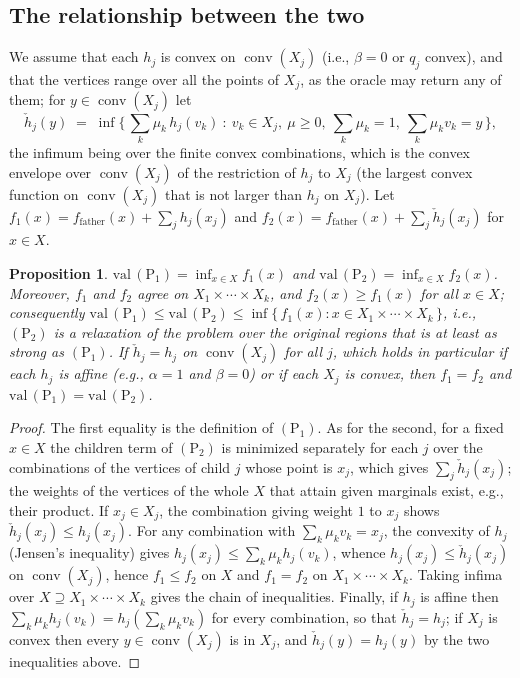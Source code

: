 \documentclass[11pt,a4paper]{article}
\newcommand{\conv}{\operatorname{conv}}
\newcommand{\ffat}{f_{\mathrm{father}}}
\newcommand{\Pone}{(\mathrm{P}_1)}
\newcommand{\Ptwo}{(\mathrm{P}_2)}
\theoremstyle{plain}
\newtheorem{proposition}{Proposition}
\theoremstyle{remark}
\begin{document}
\subsection{The relationship between the two}

We assume that each $h_j$ is convex on $\conv(X_j)$ (i.e., $\beta=0$ or $q_j$
convex), and that the vertices range over all the points of $X_j$, as the oracle
may return any of them; for $y\in\conv(X_j)$ let
\[
  \check h_j(y) \;=\; \inf\Big\{\, \textstyle\sum_k \mu_k\, h_j(v_k)\ :\
    v_k\in X_j,\ \mu\geq 0,\ \sum_k\mu_k=1,\ \sum_k\mu_k v_k=y \,\Big\},
\]
the infimum being over the finite convex combinations, which is the convex
envelope over $\conv(X_j)$ of the restriction of $h_j$ to $X_j$ (the largest
convex function on $\conv(X_j)$ that is not larger than $h_j$ on $X_j$). Let
$f_1(x)=\ffat(x)+\sum_j h_j(x_j)$ and $f_2(x)=\ffat(x)+\sum_j\check h_j(x_j)$ for
$x\in X$.

\begin{proposition}\label{prop:jensen}
$\mathrm{val}\,\Pone=\inf_{x\in X}f_1(x)$ and $\mathrm{val}\,\Ptwo=\inf_{x\in X}
f_2(x)$. Moreover, $f_1$ and $f_2$ agree on $X_1\times\cdots\times X_k$, and
$f_2(x)\geq f_1(x)$ for all $x\in X$; consequently $\mathrm{val}\,\Pone\leq
\mathrm{val}\,\Ptwo\leq\inf\{\, f_1(x) : x\in X_1\times\cdots\times X_k \,\}$,
i.e., $\Ptwo$ is a relaxation of the problem over the original regions that is
at least as strong as $\Pone$. If $\check h_j=h_j$ on $\conv(X_j)$ for all $j$,
which holds in particular if each $h_j$ is affine (e.g., $\alpha=1$ and $\beta=0$)
or if each $X_j$ is convex, then $f_1=f_2$ and $\mathrm{val}\,\Pone=\mathrm{val}\,
\Ptwo$.
\end{proposition}

\begin{proof}
The first equality is the definition of $\Pone$. As for the second, for a fixed
$x\in X$ the children term of $\Ptwo$ is minimized separately for each $j$ over
the combinations of the vertices of child $j$ whose point is $x_j$, which gives
$\sum_j\check h_j(x_j)$; the weights of the vertices of the whole $X$ that
attain given marginals exist, e.g., their product. If $x_j\in X_j$, the
combination giving weight $1$ to $x_j$ shows $\check h_j(x_j)\leq h_j(x_j)$. For
any combination with $\sum_k\mu_k v_k=x_j$, the convexity of $h_j$ (Jensen's
inequality) gives $h_j(x_j)\leq\sum_k\mu_k h_j(v_k)$, whence $h_j(x_j)\leq\check
h_j(x_j)$ on $\conv(X_j)$, hence $f_1\leq f_2$ on $X$ and $f_1=f_2$ on
$X_1\times\cdots\times X_k$. Taking infima over $X\supseteq X_1\times\cdots\times
X_k$ gives the chain of inequalities. Finally, if $h_j$ is affine then
$\sum_k\mu_k h_j(v_k)=h_j(\sum_k\mu_k v_k)$ for every combination, so that
$\check h_j=h_j$; if $X_j$ is convex then every $y\in\conv(X_j)$ is in $X_j$, and
$\check h_j(y)=h_j(y)$ by the two inequalities above.
\end{proof}
\end{document}

